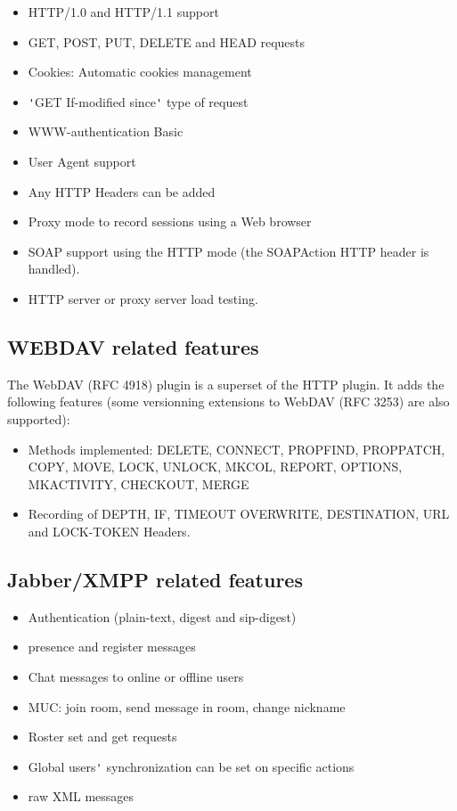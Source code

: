 \documentclass{TSUNG-en}
\begin{document}
\begin{itemize}
\item HTTP/1.0 and HTTP/1.1 support
\item GET, POST, PUT, DELETE and HEAD requests
\item Cookies: Automatic cookies management
\item \verb|'|GET If-modified since\verb|'| type of request
\item WWW-authentication Basic
\item User Agent support
\item Any HTTP Headers can be added
\item Proxy mode to record sessions using a Web browser
\item SOAP support using the HTTP mode (the SOAPAction HTTP header is
  handled).
\item HTTP server or proxy server load testing.
\end{itemize}

\subsection{WEBDAV related features}

The WebDAV (RFC 4918) plugin is a superset of the HTTP plugin. It adds the
following features (some versionning extensions to WebDAV (RFC 3253)
are also supported):

\begin{itemize}
\item Methods implemented: DELETE, CONNECT, PROPFIND, PROPPATCH, COPY,
  MOVE, LOCK, UNLOCK, MKCOL, REPORT, OPTIONS, MKACTIVITY, CHECKOUT, MERGE
\item Recording of DEPTH, IF, TIMEOUT OVERWRITE, DESTINATION, URL and
  LOCK-TOKEN Headers.
\end{itemize}

\subsection{Jabber/XMPP related features}

\begin{itemize}
\item Authentication (plain-text, digest and sip-digest)
\item presence and register messages
\item Chat messages to online or offline users
\item MUC: join room, send message in room, change nickname
\item Roster set and get requests
\item Global users\verb|'| synchronization can be set on specific actions
\item raw XML messages
\end{itemize}
\end{document}
